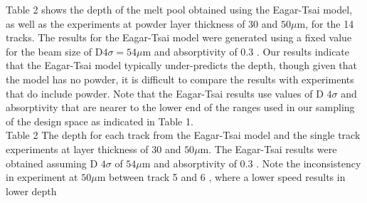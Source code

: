 \documentclass[10pt]{article}
\begin{document}
Table 2 shows the depth of the melt pool obtained using the Eagar-Tsai model, as well as the experiments at powder layer thickness of 30 and $50 \mu \mathrm{m}$, for the 14 tracks. The results for the Eagar-Tsai model were generated using a fixed value for the beam size of $\mathrm{D} 4 \sigma=54 \mu \mathrm{m}$ and absorptivity of 0.3 . Our results indicate that the Eagar-Tsai model typically under-predicts the depth, though given that the model has no powder, it is difficult to compare the results with experiments that do include powder. Note that the Eagar-Tsai results use values of D $4 \sigma$ and absorptivity that are nearer to the lower end of the ranges used in our sampling of the design space as indicated in Table 1.\\
Table 2 The depth for each track from the Eagar-Tsai model and the single track experiments at layer thickness of 30 and $50 \mu \mathrm{m}$. The Eagar-Tsai results were obtained assuming D $4 \sigma$ of $54 \mu \mathrm{m}$ and absorptivity of 0.3 . Note the inconsistency in experiment at $50 \mu \mathrm{m}$ between track 5 and 6 , where a lower speed results in lower depth
\end{document}
